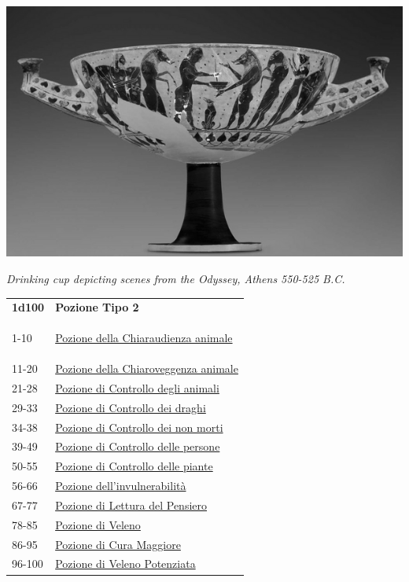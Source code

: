 \begin{multicols}{2}
{\begin{center}
\includegraphics[width=0.8\linewidth]{immagini/cupdrinking.png}

\emph{Drinking cup depicting scenes from the Odyssey, Athens 550-525 B.C.}
\end{center}

{\small\begin{tabular}{ll}
\textbf{1d100} & \textbf{Pozione Tipo 2}\\\hypertarget{Pozione Tipo 2}{}
1-10 & \hyperlink{PozionedellaChiaraudienzaanimale}{Pozione della Chiaraudienza animale}\\
11-20 & \hyperlink{PozionedellaChiaroveggenzaanimale}{Pozione della Chiaroveggenza animale}\\
21-28 & \hyperlink{PozionediControllodeglianimali}{Pozione di Controllo degli animali}\\
29-33 & \hyperlink{PozionediControllodeidraghi}{Pozione di Controllo dei draghi}\\
34-38 & \hyperlink{PozionediControllodeinonmorti}{Pozione di Controllo dei non morti}\\
39-49 & \hyperlink{PozionediControllodellepersone}{Pozione di Controllo delle persone}\\
50-55 & \hyperlink{PozionediControllodellepiante}{Pozione di Controllo delle piante}\\
56-66 & \hyperlink{Pozionedell'invulnerabilità}{Pozione dell'invulnerabilità}\\
67-77 & \hyperlink{PozionediLetturadelPensiero}{Pozione di Lettura del Pensiero}\\
78-85 & \hyperlink{PozionediVeleno}{Pozione di Veleno}\\
86-95 & \hyperlink{pozionifiltri}{Pozione di Cura Maggiore}\\
96-100 & \hyperlink{pozionifiltri}{Pozione di Veleno Potenziata}
\end{tabular}}

}
\end{multicols}
